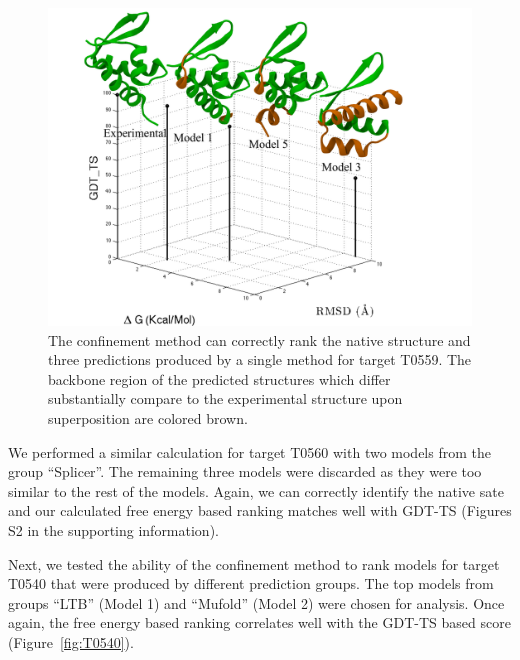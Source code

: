 \documentclass[12pt]{article}
\begin{document}
\begin{figure}
    \begin{center}
        \includegraphics[width=3.8 in]{T0559.pdf}
    \end{center}
    \caption{The confinement method can correctly rank the native structure and three predictions produced by a single
        method for target T0559. The backbone region of the predicted structures which differ substantially compare to the
        experimental structure upon superposition are colored brown.}
\label{fig:T0559}
\end{figure}

We performed a similar calculation for target T0560 with two models from the group ``Splicer''. The remaining three
models were discarded as they were too similar to the rest of the models. Again, we can correctly identify the native
sate and our calculated free energy based ranking matches well with GDT-TS (Figures S2 in the supporting information).



Next, we tested the ability of the confinement method to rank models for target T0540 that were produced by different
prediction groups. The top models from groups ``LTB'' (Model 1) and ``Mufold'' (Model 2) were chosen for analysis. Once
again, the free energy based ranking correlates well with the GDT-TS based score (Figure~\ref{fig:T0540}).
\end{document}
